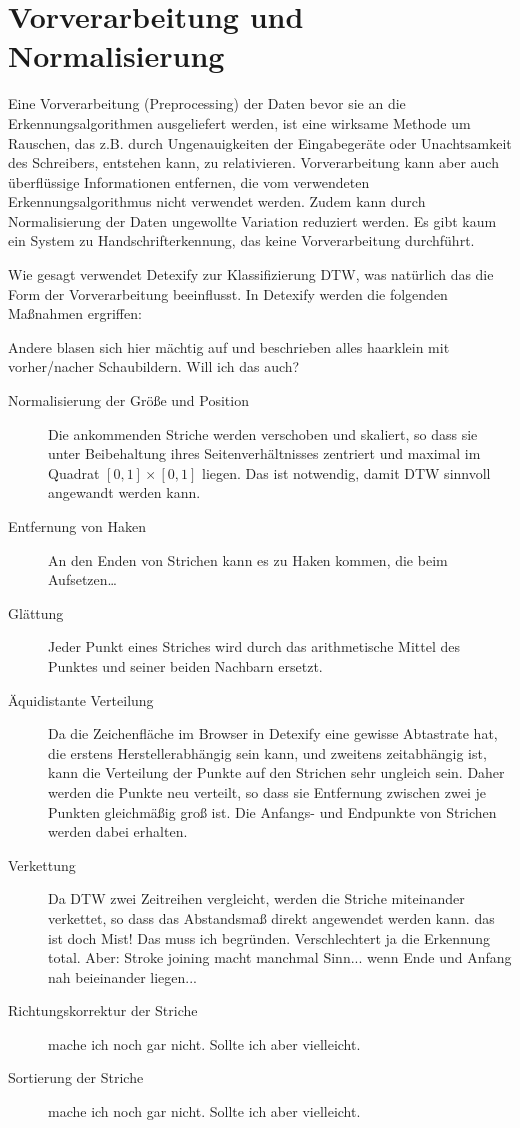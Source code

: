 \section{Vorverarbeitung und Normalisierung} 

\label{sec:vorverarbeitung}

Eine Vorverarbeitung (Preprocessing) der Daten bevor sie an die Erkennungsalgorithmen ausgeliefert werden, ist eine wirksame Methode um Rauschen, das z.B. durch Ungenauigkeiten der Eingabegeräte oder Unachtsamkeit des Schreibers, entstehen kann, zu relativieren. Vorverarbeitung kann aber auch überflüssige Informationen entfernen, die vom verwendeten Erkennungsalgorithmus nicht verwendet werden. Zudem kann durch Normalisierung der Daten ungewollte Variation reduziert werden. Es gibt kaum ein System zu Handschrifterkennung, das keine Vorverarbeitung durchführt.

Wie gesagt verwendet Detexify zur Klassifizierung \ac{DTW}, was natürlich das die Form der Vorverarbeitung beeinflusst. In Detexify werden die folgenden Maßnahmen ergriffen:

\TODO Andere blasen sich hier mächtig auf und beschrieben alles haarklein mit vorher/nacher Schaubildern. Will ich das auch?

\begin{description}
  \item[Normalisierung der Größe und Position] Die ankommenden Striche werden verschoben und skaliert, so dass sie unter Beibehaltung ihres Seitenverhältnisses zentriert und maximal im Quadrat \([0,1]\times[0,1]\) liegen. Das ist notwendig, damit \ac{DTW} sinnvoll angewandt werden kann.
  \item[Entfernung von Haken]
  \TODO An den Enden von Strichen kann es zu Haken kommen, die beim Aufsetzen\dots
  \item[Glättung] Jeder Punkt eines Striches wird durch das arithmetische Mittel des Punktes und seiner beiden Nachbarn ersetzt. 
  \item[Äquidistante Verteilung] Da die Zeichenfläche im Browser in Detexify eine gewisse Abtastrate hat, die erstens Herstellerabhängig sein kann, und zweitens zeitabhängig ist, kann die Verteilung der Punkte auf den Strichen sehr ungleich sein. Daher werden die Punkte neu verteilt, so dass sie Entfernung zwischen zwei je Punkten gleichmäßig groß ist. Die Anfangs- und Endpunkte von Strichen werden dabei erhalten. 
  \item[Verkettung] Da \ac{DTW} zwei Zeitreihen vergleicht, werden die Striche miteinander verkettet, so dass das Abstandsmaß direkt angewendet werden kann. \TODO das ist doch Mist! Das muss ich begründen. Verschlechtert ja die Erkennung total. Aber: Stroke joining macht manchmal Sinn... wenn Ende und Anfang nah beieinander liegen...
  \item[Richtungskorrektur der Striche] \TODO mache ich noch gar nicht. Sollte ich aber vielleicht. 
  \item[Sortierung der Striche] \TODO mache ich noch gar nicht. Sollte ich aber vielleicht.
\end{description}

